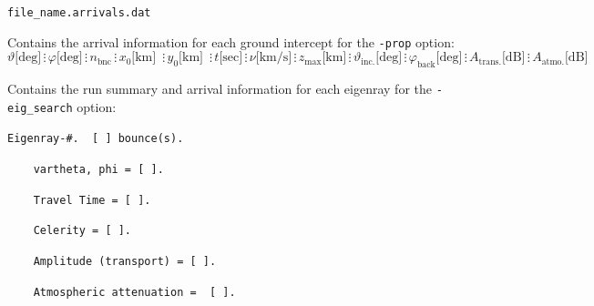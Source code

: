 \documentclass[10pt]{article}
\begin{document}
	\verb=file_name.arrivals.dat=
	
	Contains the arrival information for each ground intercept for the \verb=-prop= option:
	\begin{equation*}
	\vartheta \text{[deg]} \hspace{2pt} \vdots \hspace{2pt} 
	\varphi \text{[deg]} \hspace{2pt} \vdots \hspace{2pt} 
	n_\text{bnc} \hspace{2pt} \vdots \hspace{2pt}
	x_0 \text{[km] } \hspace{2pt} \vdots \hspace{2pt}  
	y_0 \text{[km] } \hspace{2pt} \vdots \hspace{2pt}  
	t \text{[sec]} \hspace{2pt} \vdots \hspace{2pt} 
	\nu \text{[km/s]} \hspace{2pt} \vdots \hspace{2pt} 
	z_\text{max} \text{[km]} \hspace{2pt} \vdots \hspace{2pt} 
	\vartheta_\text{inc.} \text{[deg]} \hspace{2pt} \vdots \hspace{2pt}
	\varphi_\text{back} \text{[deg]} \hspace{2pt} \vdots \hspace{2pt}
	A_\text{trans.} \text{[dB]} \hspace{2pt} \vdots \hspace{2pt}
	A_\text{atmo.} \text{[dB]}	
	\end{equation*}

	Contains the run summary and arrival information for each eigenray for the \verb=-eig_search= option:

	\verb=Eigenray-#.  [ ] bounce(s).=
	
	\hspace{25pt} \verb#	vartheta, phi = [ ].#
	
	\hspace{25pt} \verb#	Travel Time = [ ]. #

	\hspace{25pt} \verb#	Celerity = [ ]. #

 	\hspace{25pt} \verb#	Amplitude (transport) = [ ]. #

 	\hspace{24pt} \verb#	Atmospheric attenuation =  [ ]. #
\end{document}
